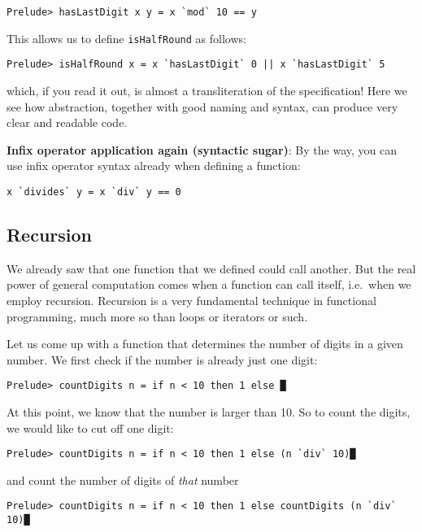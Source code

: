 \documentclass[11pt,
  american,
  DIV13]{article}
\begin{document}
\begin{verbatim}
Prelude> hasLastDigit x y = x `mod` 10 == y
\end{verbatim}

This allows us to define \texttt{isHalfRound} as follows:

\begin{verbatim}
Prelude> isHalfRound x = x `hasLastDigit` 0 || x `hasLastDigit` 5
\end{verbatim}

which, if you read it out, is almost a transliteration of the
specification! Here we see how abstraction, together with good naming
and syntax, can produce very clear and readable code.

\textbf{Infix operator application again (syntactic sugar)}: By the way,
you can use infix operator syntax already when defining a function:

\begin{verbatim}
x `divides` y = x `div` y == 0
\end{verbatim}

\hypertarget{recursion}{%
\subsection{Recursion}\label{recursion}}

We already saw that one function that we defined could call another. But
the real power of general computation comes when a function can call
itself, i.e.~when we employ recursion. Recursion is a very fundamental
technique in functional programming, much more so than loops or
iterators or such.

Let us come up with a function that determines the number of digits in a
given number. We first check if the number is already just one digit:

\begin{verbatim}
Prelude> countDigits n = if n < 10 then 1 else █
\end{verbatim}

At this point, we know that the number is larger than 10. So to count
the digits, we would like to cut off one digit:

\begin{verbatim}
Prelude> countDigits n = if n < 10 then 1 else (n `div` 10)█
\end{verbatim}

and count the number of digits of \emph{that} number

\begin{verbatim}
Prelude> countDigits n = if n < 10 then 1 else countDigits (n `div` 10)█
\end{verbatim}
\end{document}
